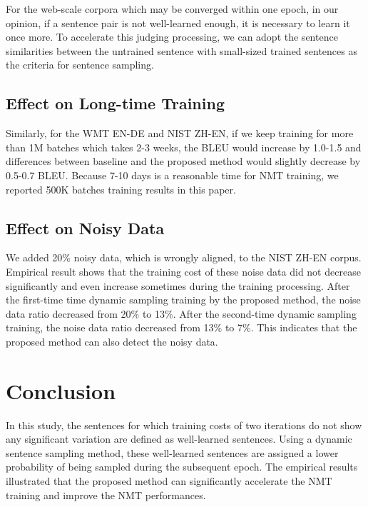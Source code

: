 \documentclass[11pt,a4paper]{article}
\begin{document}
For the web-scale corpora which may be converged within one epoch, in our opinion, if a sentence pair is not well-learned enough, it is necessary to learn it once more. To accelerate this judging processing, we can adopt the sentence similarities between the untrained sentence with small-sized trained sentences as the criteria for sentence sampling. 

\subsection{Effect on Long-time Training}
\label{sec:ltt}
Similarly, for the WMT EN-DE and NIST ZH-EN, if we keep training for more than 1M batches which takes 2-3 weeks, the BLEU would increase by 1.0-1.5 and differences between baseline and the proposed method would slightly decrease by 0.5-0.7 BLEU. Because 7-10 days is a reasonable time for NMT training, we reported 500K batches training results in this paper.

\subsection{Effect on Noisy Data}
\label{sec:nd}

We added 20\% noisy data, which is wrongly aligned, to the NIST ZH-EN corpus. Empirical result shows that the training cost of these noise data did not decrease significantly and even increase sometimes during the training processing. After the first-time time dynamic sampling training by the proposed method, the noise data ratio decreased from 20\% to 13\%. After the second-time dynamic sampling training, the noise data ratio decreased from 13\% to 7\%. This indicates that the proposed method can also detect the noisy data. 

\section{Conclusion}
\label{sec:con}
In this study, the sentences for which training costs of two iterations do not show any significant variation are defined as well-learned sentences. Using a dynamic sentence sampling method, these well-learned sentences are assigned a lower probability of being sampled during the subsequent epoch. The empirical results illustrated that the proposed method can significantly accelerate the NMT training and improve the NMT performances.


%
%


\end{document}
